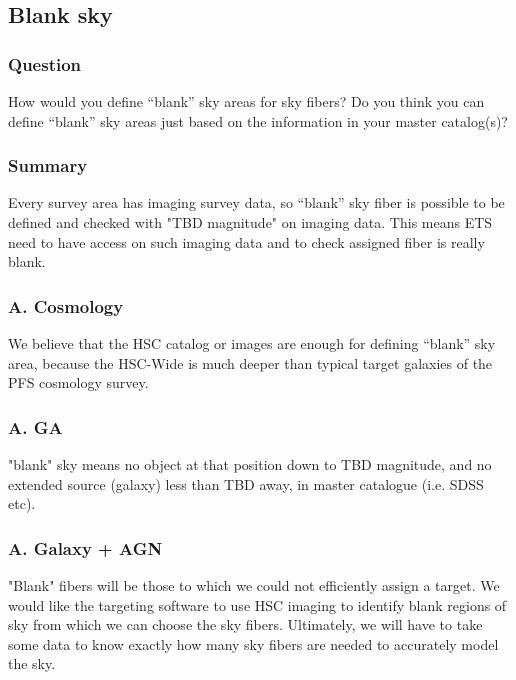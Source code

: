 \documentclass[a4paper,notitlepage]{article}
\begin{document}
\subsection{Blank sky}

\subsubsection{Question}
How would you define ``blank'' sky areas for sky
           fibers? Do you think you can define ``blank'' sky areas
           just based on the information in your master catalog(s)?

\subsubsection{Summary}

Every survey area has imaging survey data, so ``blank'' sky fiber is possible 
to be defined and checked with "TBD magnitude" on imaging data. 
This means ETS need to have access on such imaging data and to check assigned 
fiber is really blank. 

\subsubsection{A. Cosmology}
We believe that the HSC catalog or images are enough for defining
``blank'' sky area, because the HSC-Wide is much deeper than typical
target galaxies of the PFS cosmology survey.

\subsubsection{A. GA}
"blank" sky means no object at that position down to TBD magnitude,
and no extended source (galaxy) less than TBD away, in master
catalogue (i.e. SDSS etc).
 

\subsubsection{A. Galaxy + AGN}
"Blank" fibers will be those to which we could not efficiently assign
a target.  We would like the targeting software to use HSC imaging to
identify blank regions of sky from which we can choose the sky fibers.
Ultimately, we will have to take some data to know exactly how many
sky fibers are needed to accurately model the sky.
\end{document}

